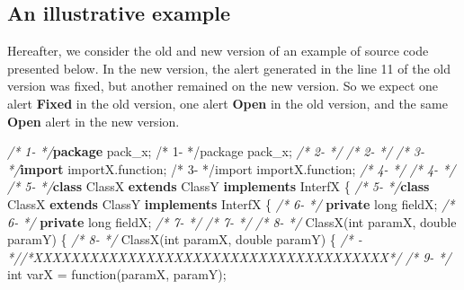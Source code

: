 \documentclass[
]{article}
\newenvironment{Shaded}{\begin{snugshade}}{\end{snugshade}}
\newcommand{\CommentTok}[1]{\textcolor[rgb]{0.56,0.35,0.01}{\textit{#1}}}
\newcommand{\DataTypeTok}[1]{\textcolor[rgb]{0.13,0.29,0.53}{#1}}
\newcommand{\FunctionTok}[1]{\textcolor[rgb]{0.00,0.00,0.00}{#1}}
\newcommand{\ImportTok}[1]{#1}
\newcommand{\KeywordTok}[1]{\textcolor[rgb]{0.13,0.29,0.53}{\textbf{#1}}}
\newcommand{\NormalTok}[1]{#1}
\begin{document}
\subsection{An illustrative example}\label{source_used}

Hereafter, we consider the old and new version of an example of source
code presented below. In the new version, the alert generated in the
line 11 of the old version was fixed, but another remained on the new
version. So we expect one alert \textbf{Fixed} in the old version, one
alert \textbf{Open} in the old version, and the same \textbf{Open} alert
in the new version.

\scriptsize

\begin{Shaded}
\begin{Highlighting}[]
\CommentTok{/*  1{-}   */}\KeywordTok{package}\ImportTok{ pack\_x;                                          /*  1{-}   */package pack\_x;}                                          
\CommentTok{/*  2{-}   */}                                                         \CommentTok{/*  2{-}   */}                                                         
\CommentTok{/*  3{-}   */}\KeywordTok{import}\ImportTok{ importX.function;                                 /*  3{-}   */import importX.function;}                                 
\CommentTok{/*  4{-}   */}                                                         \CommentTok{/*  4{-}   */}                                                         
\CommentTok{/*  5{-}   */}\KeywordTok{class}\NormalTok{ ClassX }\KeywordTok{extends}\NormalTok{ ClassY }\KeywordTok{implements}\NormalTok{ InterfX \{         }\CommentTok{/*  5{-}   */}\KeywordTok{class}\NormalTok{ ClassX }\KeywordTok{extends}\NormalTok{ ClassY }\KeywordTok{implements}\NormalTok{ InterfX \{         }
\CommentTok{/*  6{-}   */}    \KeywordTok{private} \DataTypeTok{long}\NormalTok{ fieldX;                                 }\CommentTok{/*  6{-}   */}    \KeywordTok{private} \DataTypeTok{long}\NormalTok{ fieldX;                                 }
\CommentTok{/*  7{-}   */}                                                         \CommentTok{/*  7{-}   */}                                                         
\CommentTok{/*  8{-}   */}    \FunctionTok{ClassX}\NormalTok{(}\DataTypeTok{int}\NormalTok{ paramX, }\DataTypeTok{double}\NormalTok{ paramY) \{                  }\CommentTok{/*  8{-}   */}    \FunctionTok{ClassX}\NormalTok{(}\DataTypeTok{int}\NormalTok{ paramX, }\DataTypeTok{double}\NormalTok{ paramY) \{                  }
\CommentTok{/*   {-}   *//*XXXXXXXXXXXXXXXXXXXXXXXXXXXXXXXXXXXXXX*/}               \CommentTok{/*  9{-}   */}        \DataTypeTok{int}\NormalTok{ varX = }\FunctionTok{function}\NormalTok{(paramX, paramY);                  }

\end{Highlighting}
\end{Shaded}
\end{document}
